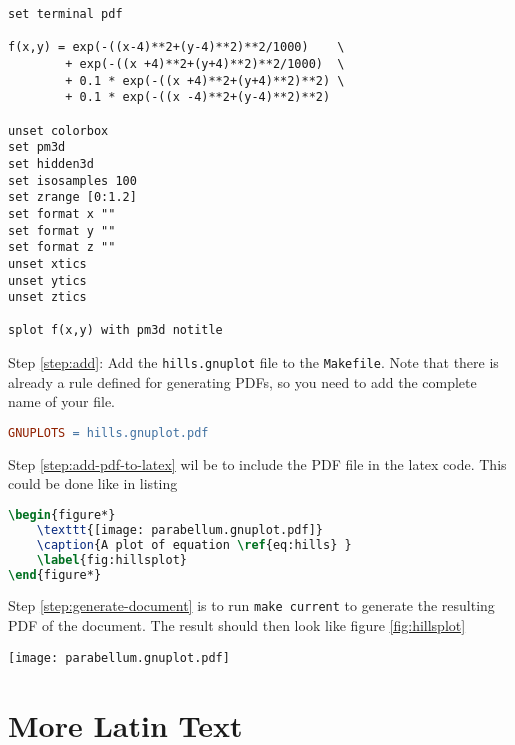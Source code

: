 \documentclass[10pt, a4paper]{article} %
\newcommand{\code}[1]{\texttt{#1}}
\newcommand{\filename}[1]{\texttt{#1}}
\begin{document}
\begin{lstlisting}[language=Gnuplot, caption={Gnuplot code for plotting a hilly landscape.}, label=lst:gnuplot-hills]
set terminal pdf

f(x,y) = exp(-((x-4)**2+(y-4)**2)**2/1000)    \
		+ exp(-((x +4)**2+(y+4)**2)**2/1000)  \
		+ 0.1 * exp(-((x +4)**2+(y+4)**2)**2) \
		+ 0.1 * exp(-((x -4)**2+(y-4)**2)**2)

unset colorbox
set pm3d
set hidden3d
set isosamples 100
set zrange [0:1.2]
set format x ""
set format y ""
set format z ""
unset xtics
unset ytics
unset ztics

splot f(x,y) with pm3d notitle
\end{lstlisting}

Step \ref{step:add}: Add the \filename{hills.gnuplot} file to the \filename{Makefile}. Note that there is already a rule defined for generating PDFs, so you need to add the complete name of your file.
\begin{lstlisting}[language=make, caption={Adding a new gnuplot file to the Makefile.}, label=lst:add-gnuplot-to-makefile]
GNUPLOTS = hills.gnuplot.pdf
\end{lstlisting}

Step \ref{step:add-pdf-to-latex} wil be to include the PDF file in the latex code. This could be done like in listing 

\begin{lstlisting}[language=TeX, caption={Indlucind a PDF as a figure}, label=lst:include-pdf-as-figure]
\begin{figure*}
	\texttt{[image: parabellum.gnuplot.pdf]} 
	\caption{A plot of equation \ref{eq:hills} } 
	\label{fig:hillsplot}
\end{figure*}
\end{lstlisting}

Step \ref{step:generate-document} is to run \code{make current} to generate the resulting PDF of the document. The result should then look like figure \ref{fig:hillsplot}

\begin{figure*}
	\texttt{[image: parabellum.gnuplot.pdf]} 
	\caption{A plot of equation \ref{eq:hills} } 
	\label{fig:hillsplot}
\end{figure*}

\section{More Latin Text}
\end{document}
